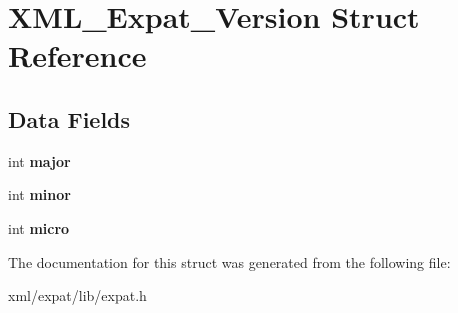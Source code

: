 \hypertarget{struct_x_m_l___expat___version}{\section{X\-M\-L\-\_\-\-Expat\-\_\-\-Version Struct Reference}
\label{struct_x_m_l___expat___version}
}
\subsection*{Data Fields}
\begin{DoxyCompactItemize}
\item 
\hypertarget{struct_x_m_l___expat___version_a0c16da8d497c8eefd86a1bb4c6ea23b5}{int {\bfseries major}}\label{struct_x_m_l___expat___version_a0c16da8d497c8eefd86a1bb4c6ea23b5}

\item 
\hypertarget{struct_x_m_l___expat___version_ab9b1e025090b5f4e7c8f206c72aeb8b6}{int {\bfseries minor}}\label{struct_x_m_l___expat___version_ab9b1e025090b5f4e7c8f206c72aeb8b6}

\item 
\hypertarget{struct_x_m_l___expat___version_ac6b159560f37010366faaf9531f74929}{int {\bfseries micro}}\label{struct_x_m_l___expat___version_ac6b159560f37010366faaf9531f74929}

\end{DoxyCompactItemize}


The documentation for this struct was generated from the following file\-:\begin{DoxyCompactItemize}
\item 
xml/expat/lib/expat.\-h\end{DoxyCompactItemize}
